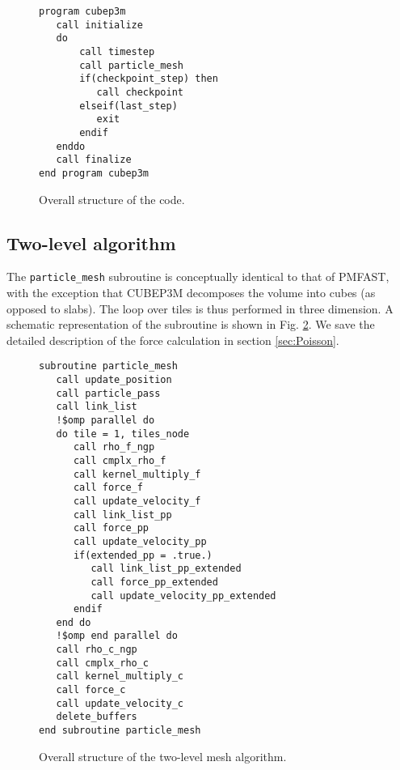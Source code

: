 \begin{figure}
\begin{verbatim}
program cubep3m
   call initialize
   do
       call timestep
       call particle_mesh
       if(checkpoint_step) then
          call checkpoint
       elseif(last_step)
          exit
       endif
   enddo
   call finalize
end program cubep3m
\end{verbatim}
\caption{Overall structure of the code.}
\label{fig:structure}
\end{figure}

\subsection{Two-level algorithm}
\label{subsec:particle_mesh}

The {\tt particle\_mesh} subroutine is conceptually identical to that of {\small PMFAST}, with the exception  that {\small CUBEP3M}
decomposes the volume into cubes (as opposed to slabs). The loop over tiles is thus performed in three dimension.
A schematic representation of the subroutine is shown in Fig. \ref{fig:particle_mesh}.
We save the detailed description of the force calculation  in section \ref{sec:Poisson}.

\begin{figure}
\begin{verbatim}
subroutine particle_mesh
   call update_position
   call particle_pass
   call link_list
   !$omp parallel do
   do tile = 1, tiles_node
      call rho_f_ngp
      call cmplx_rho_f
      call kernel_multiply_f
      call force_f
      call update_velocity_f      
      call link_list_pp
      call force_pp
      call update_velocity_pp
      if(extended_pp = .true.)
         call link_list_pp_extended
         call force_pp_extended
         call update_velocity_pp_extended       
      endif
   end do
   !$omp end parallel do
   call rho_c_ngp
   call cmplx_rho_c
   call kernel_multiply_c
   call force_c
   call update_velocity_c      
   delete_buffers
end subroutine particle_mesh
\end{verbatim}
\caption{Overall structure of the two-level mesh algorithm.}
\label{fig:particle_mesh}
\end{figure}


